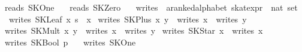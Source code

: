 \begin{isabellebody}
{}\ {}reads\ SKOne\ {}\ {}{}{}\isanewline
{}\ {}reads\ SKZero\ {}\ {}{}{}\isanewline
\isanewline
{}\isamarkupfalse%
\ writes\ {}{}\ {}{}a{}{}ranked{}alphabet\ skat{}expr\ {}\ nat\ set{}\ \isanewline
\ \ {}writes\ {}SKLeaf\ x\ s{}\ {}\ {}x{}{}\isanewline
{}\ {}writes\ {}SKPlus\ x\ y{}\ {}\ writes\ x\ {}\ writes\ y{}\isanewline
{}\ {}writes\ {}SKMult\ x\ y{}\ {}\ writes\ x\ {}\ writes\ y{}\isanewline
{}\ {}writes\ {}SKStar\ x{}\ {}\ writes\ x{}\isanewline
{}\ {}writes\ {}SKBool\ p{}\ {}\ {}{}{}\isanewline
{}\ {}writes\ SKOne\ {}\ {}{}{}\isanewline

\end{isabellebody}
